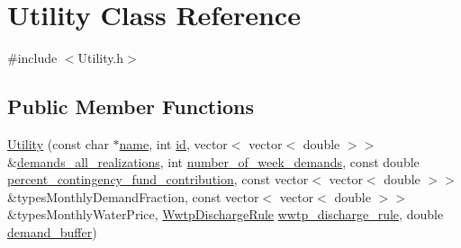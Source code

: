 \hypertarget{classUtility}{}\section{Utility Class Reference}
\label{classUtility}


{\ttfamily \#include $<$Utility.\+h$>$}

\subsection*{Public Member Functions}
\begin{DoxyCompactItemize}
\item 
\mbox{\hyperlink{classUtility_adb0e1f43122886122d2437efbc5cd756_adb0e1f43122886122d2437efbc5cd756}{Utility}} (const char $\ast$\mbox{\hyperlink{classUtility_ad0ce5c179a7f5ceb46d4fcae08dbfb47_ad0ce5c179a7f5ceb46d4fcae08dbfb47}{name}}, int \mbox{\hyperlink{classUtility_ad41c4ea5c911c5000452a3371cd65d5f_ad41c4ea5c911c5000452a3371cd65d5f}{id}}, vector$<$ vector$<$ double $>$$>$ \&\mbox{\hyperlink{classUtility_a8ffed6cb590d6f0855128828c3f289b8_a8ffed6cb590d6f0855128828c3f289b8}{demands\+\_\+all\+\_\+realizations}}, int \mbox{\hyperlink{classUtility_a0548db3746582251082aa430db49dad0_a0548db3746582251082aa430db49dad0}{number\+\_\+of\+\_\+week\+\_\+demands}}, const double \mbox{\hyperlink{classUtility_a7b1a097ec188be8e7175d058b5e6596c_a7b1a097ec188be8e7175d058b5e6596c}{percent\+\_\+contingency\+\_\+fund\+\_\+contribution}}, const vector$<$ vector$<$ double $>$$>$ \&types\+Monthly\+Demand\+Fraction, const vector$<$ vector$<$ double $>$$>$ \&types\+Monthly\+Water\+Price, \mbox{\hyperlink{classWwtpDischargeRule}{Wwtp\+Discharge\+Rule}} \mbox{\hyperlink{classUtility_a0c598532230472e8106f6a71f97ea62d_a0c598532230472e8106f6a71f97ea62d}{wwtp\+\_\+discharge\+\_\+rule}}, double \mbox{\hyperlink{classUtility_a4be9760339ec06e5c932890da8e566b3_a4be9760339ec06e5c932890da8e566b3}{demand\+\_\+buffer}})
\item 
$$
\end{DoxyCompactItemize}
